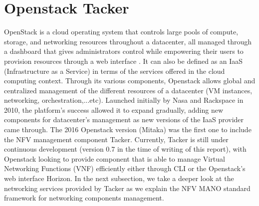 \section{Openstack Tacker}
OpenStack is a cloud operating system that controls large pools of compute, storage, and networking resources throughout a datacenter, all managed through a dashboard that gives administrators control while empowering their users to provision resources through a web interface \cite{openstack}. It can also be defined as an IaaS (Infrastructure as a Service) in terms of the services offered in the cloud computing context. Through its various components, Openstack allows global and centralized management of the different resources of a datacenter (VM instances, networking, orchestration,...etc). Launched initially by Nasa and Rackspace in 2010, the platform's success allowed it to expand gradually, adding new components for datacenter's management as new versions of the IaaS provider came through. The 2016 Openstack version (Mitaka) was the first one to include the NFV management component Tacker. Currently, Tacker is still under continuous development (version 0.7 in the time of writing of this report), with Openstack looking to provide component that is able to manage Virtual Networking Functions (VNF) efficiently either through CLI or the Openstack's web interface Horizon. In the next subsection, we take a deeper look at the networking services provided by Tacker as we explain the NFV MANO standard framework for networking components management.
